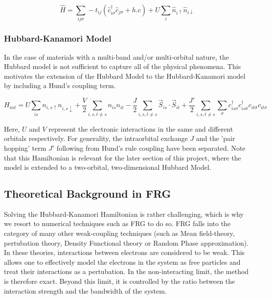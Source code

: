 \documentclass[12pt]{article}
\begin{document}
\begin{equation}\label{t Hubbard model}
    \hat{H} = \sum_{ij\sigma} -t_{ij}(\hat{c}_{i\sigma}^{\dagger}\hat{c}_{j \sigma} + h.c) 
    + U \sum_{i} \hat{n}_{i \uparrow} \hat{n}_{i \downarrow}
\end{equation}





\subsubsection{Hubbard-Kanamori Model}
In the case of materials with a multi-band and/or multi-orbital nature, the Hubbard model is not sufficient to capture all of the physical phenomena. This motivates the extension of the Hubbard Model to the Hubbard-Kanamori model\cite{sherman2020hubbard} by including a Hund's coupling term.

\begin{equation} \label{Hubbard-Kanamori Model}
    H_{int} = U \sum_{is}n_{i,s\uparrow}n_{i,s\downarrow} + \frac{V}{2} \sum_{i,s,t \neq s} n_{is}n_{it} -\frac{J}{2} \sum_{i,s,t \neq s} \vec{S}_{is} \cdot \vec{S}_{it} 
    + \frac{J'}{2} \sum_{i,s,t \neq s} \sum_{\sigma} c_{is\sigma}^{\dagger}c_{is\bar{\sigma}}^{\dagger}c_{it\bar{\sigma}}c_{it\sigma}
\end{equation}

\noindent Here, $U$ and $V$ represent the electronic interactions in the same and different orbitals respectively. For generality, the intraorbital exchange $J$ and the 'pair hopping' term $J'$ following from Hund's rule coupling have been separated.  
Note that this Hamiltonian is relevant for the later section of this project, where the model is extended to a two-orbital, two-dimensional Hubbard Model.

\subsection{Theoretical Background in FRG}

Solving the Hubbard-Kanamori Hamiltonian is rather challenging, which is why we resort to numerical techniques such as FRG to do so. FRG falls into the category of many other weak-coupling techniques (such as Mean field-theory\cite{kadanoff2009more}, pertubation theory\cite{nagaosa2013quantum}, Density Functional theory\cite{kohn1965self} or Random Phase approximation\cite{bohm1951collective}).
In these theories, interactions between electrons are considered to be weak. This allows one to effectively model the electrons in the system as free particles 
and treat their interactions as a pertubation. In the non-interacting limit, the method is therefore exact. Beyond this limit, it is controlled by the ratio between the interaction
strength and the bandwidth of the system. 
\end{document}
